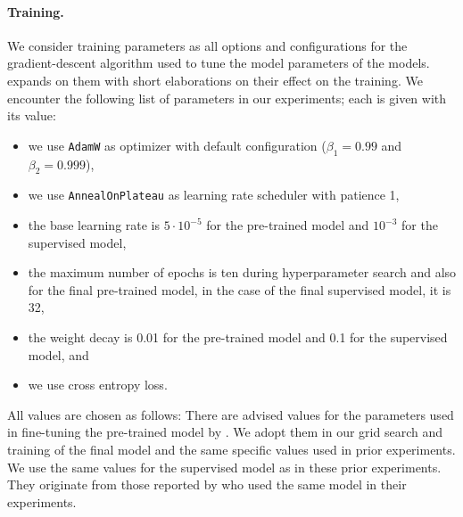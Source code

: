 \documentclass[../../document.tex]{subfiles}
\begin{document}
    \paragraph*{Training.}
    We consider training parameters as all options and configurations for the gradient-descent algorithm  used to tune the model parameters of the  models.
     expands on them with short elaborations on their effect on the training.
    We encounter the following list of parameters in our experiments; each is given with its value:
    \begin{itemize}
        \item we use \texttt{AdamW} as optimizer with default configuration ($\beta_1 = 0.99$ and $\beta_2 = 0.999$),
        \item we use \texttt{AnnealOnPlateau} as learning rate scheduler with patience 1,
        \item the base learning rate is $5\cdot 10^{-5}$ for the pre-trained model and $10^{-3}$ for the supervised model,
        \item the maximum number of epochs is ten during hyperparameter search and also for the final pre-trained model, in the case of the final supervised model, it is 32,
        \item the weight decay is 0.01 for the pre-trained model and 0.1 for the supervised model, and
        \item we use cross entropy loss.
    \end{itemize}
    All values are chosen as follows:
    There are advised values for the parameters used in fine-tuning the pre-trained model by \citet{Devlin2019}.
    We adopt them in our grid search and training of the final model and the same specific values used in prior experiments. \citep[cf.\@][]{Rup22}
    We use the same values for the supervised model as in these prior experiments.
    They originate from those reported by \citet{Cor20,StaSte20} who used the same model in their experiments.
\end{document}
